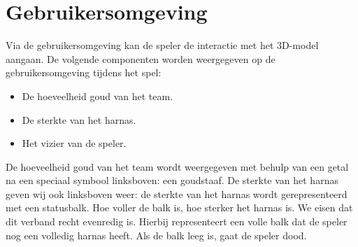 \section{Gebruikersomgeving}
\label{sec:UI}

Via de gebruikersomgeving kan de speler de interactie met het 3D-model aangaan. De volgende componenten worden weergegeven op de gebruikersomgeving tijdens het spel:
\begin{itemize}
\item De hoeveelheid goud van het team.
\item De sterkte van het harnas.
\item Het vizier van de speler.
\end{itemize}

De hoeveelheid goud van het team wordt weergegeven met behulp van een getal na een speciaal symbool linksboven: een goudstaaf. De sterkte van het harnas geven wij ook linksboven weer: de sterkte van het harnas wordt gerepresenteerd met een statusbalk. Hoe voller de balk is, hoe sterker het harnas is. We eisen dat dit verband recht evenredig is. Hierbij representeert een volle balk dat de speler nog een volledig harnas heeft. Als de balk leeg is, gaat de speler dood.

